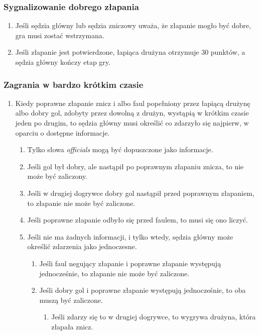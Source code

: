 \documentclass[11pt,a4paper]{article}
\begin{document}
\subsubsection{Sygnalizowanie dobrego złapania}
\begin{enumerate}
  \item Jeśli sędzia główny lub sędzia zniczowy uważa, że złapanie mogło być dobre, gra musi zostać wstrzymana.
  \item Jeśli złapanie jest potwierdzone, łapiąca drużyna otrzymuje 30 punktów, a sędzia główny kończy etap gry.
\end{enumerate}

\subsubsection{Zagrania w bardzo krótkim czasie}
\begin{enumerate}
  \item Kiedy poprawne złapanie znicz i albo faul popełniony przez łapiącą drużynę albo dobry gol, zdobyty przez dowolną z drużyn, wystąpią w krótkim czasie jeden po drugim, to sędzia główny musi określić co zdarzyło się najpierw, w oparciu o dostępne informacje.
  \begin{enumerate}
    \item Tylko słowa \emph{officials} mogą być dopuszczone jako informacje.
    \item Jeśli gol był dobry, ale nastąpił po poprawnym złapaniu znicza, to nie może być zaliczony.
    \item Jeśli w drugiej dogrywce dobry gol nastąpił przed poprawnym złapaniem, to złapanie nie może być zaliczone.
    \item Jeśli poprawne złapanie odbyło się przed faulem, to musi się ono liczyć.
    \item Jeśli nie ma żadnych informacji, i tylko wtedy, sędzia główny może określić zdarzenia jako jednoczesne.
    \begin{enumerate}
      \item Jeśli faul negujący złapanie i poprawne złapanie występują jednocześnie, to złapanie nie może być zaliczone.
      \item Jeśli dobry gol i poprawne złapanie występują jednocześnie, to oba muszą być zaliczone.
      \begin{enumerate}
        \item Jeśli zdarzy się to w drugiej dogrywce, to wygrywa drużyna, która złapała znicz.
      \end{enumerate}
    \end{enumerate}
  \end{enumerate}
\end{enumerate}
\end{document}
